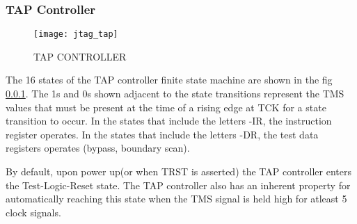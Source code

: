 \documentclass[a4paper,11pt]{article}
\begin{document}
\subsubsection{TAP Controller}

\begin{figure}[ht]
\centering
\texttt{[image: jtag\_tap]}
\caption{TAP CONTROLLER}
\end{figure}

The 16 states of the TAP controller finite state machine are shown in the fig \ref{}. The 1s and 0s shown adjacent to the state transitions represent the TMS values that must be present at the time of a rising edge at TCK for a state transition to occur. In the states that include the letters -IR, the instruction register operates. In the states that include the letters -DR, the test data registers operates (bypass, boundary scan).

By default, upon power up(or when TRST is asserted) the TAP controller enters the Test-Logic-Reset state. The TAP controller also has an inherent property for automatically reaching this state when the TMS signal is held high for atleast 5 clock signals.
\end{document}
